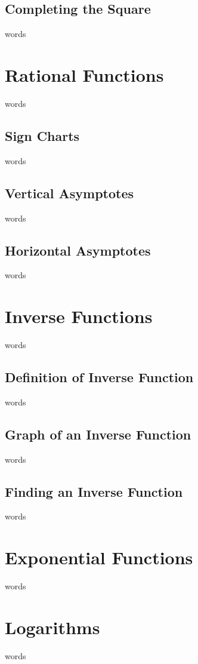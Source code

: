 \subsection{Completing the Square}
words


\section{Rational Functions}
words


\subsection{Sign Charts}
words

\subsection{Vertical Asymptotes}
words

\subsection{Horizontal Asymptotes}
words


\section{Inverse Functions}
words

\subsection{Definition of Inverse Function}
words

\subsection{Graph of an Inverse Function}
words

\subsection{Finding an Inverse Function}
words

\section{Exponential Functions}
words

\section{Logarithms}
words

